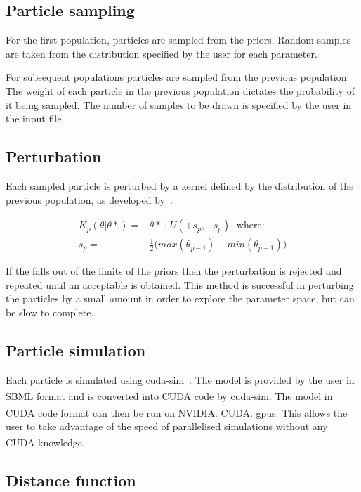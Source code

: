 \subsection{Particle sampling}
\label{sec:part_samp}
For the first population, particles are sampled from the priors. Random samples are taken from the distribution specified by the user for each parameter. 

For subsequent populations particles are sampled from the previous population. The weight of each particle in the previous population dictates the probability of it being sampled. The number of samples to be drawn is specified by the user in the input file.  

\subsection{Perturbation}
\label{sec:pertub}
Each sampled particle is perturbed by a kernel defined by the distribution of the previous population, as developed by~\textcite{Toni:2009tr}. 

\begin{align}
K_p(\theta|\theta* ) =& \theta* + U(+s_p, -s_p)\text{, where:} \\
s_p =& \frac{1}{2} \big (max(\theta_{p-1}) - min(\theta_{p-1}) \big )
\end{align}

If the \texttheta* falls out of the limits of the priors then the perturbation is rejected and repeated until an acceptable \texttheta* is obtained. This method is successful in perturbing the particles by a small amount in order to explore the parameter space, but can be slow to complete. 

\subsection{Particle simulation}
\label{sec:sim}
Each particle is simulated using cuda-sim~\autocite{Zhou:2011hp}. The model is provided by the user in SBML format and is converted into CUDA\textsuperscript{\textregistered} code by cuda-sim. The model in CUDA\textsuperscript{\textregistered} code format can then be run on NVIDIA\textsuperscript{\textregistered}. CUDA\textsuperscript{\textregistered}. \acrshort{gpu}s. This allows the user to take advantage of the speed of parallelised simulations without any CUDA\textsuperscript{\textregistered} knowledge. 

\subsection{Distance function}


